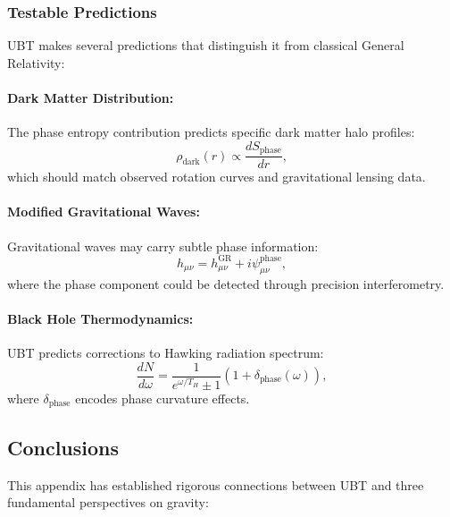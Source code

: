 \subsubsection{Testable Predictions}

UBT makes several predictions that distinguish it from classical General Relativity:

\paragraph{Dark Matter Distribution:}
The phase entropy contribution predicts specific dark matter halo profiles:
\begin{equation}
\rho_{\text{dark}}(r) \propto \frac{dS_{\text{phase}}}{dr},
\end{equation}
which should match observed rotation curves and gravitational lensing data.

\paragraph{Modified Gravitational Waves:}
Gravitational waves may carry subtle phase information:
\begin{equation}
h_{\mu\nu} = h_{\mu\nu}^{\text{GR}} + i\psi_{\mu\nu}^{\text{phase}},
\end{equation}
where the phase component could be detected through precision interferometry.

\paragraph{Black Hole Thermodynamics:}
UBT predicts corrections to Hawking radiation spectrum:
\begin{equation}
\frac{dN}{d\omega} = \frac{1}{e^{\omega/T_H} \pm 1}\left(1 + \delta_{\text{phase}}(\omega)\right),
\end{equation}
where $\delta_{\text{phase}}$ encodes phase curvature effects.

\subsection{Conclusions}

This appendix has established rigorous connections between UBT and three fundamental perspectives on gravity:

